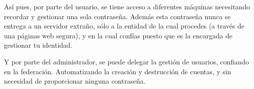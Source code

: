 Así pues, por parte del usuario, se tiene acceso a diferentes máquinas
necesitando recordar y gestionar una sola contraseña. Además esta
contraseña nunca se entrega a un servidor extraño, sólo a la entidad
de la cual procedes (a través de una páginas web segura), y en la cual
confías puesto que es la encargada de gestionar tu identidad.

Y por parte del administrador, se puede delegar la gestión de
usuarios, confiando en la federación. Automatizando la creación y
destrucción de cuentas, y sin necesidad de proporcionar ninguna
contraseña.
